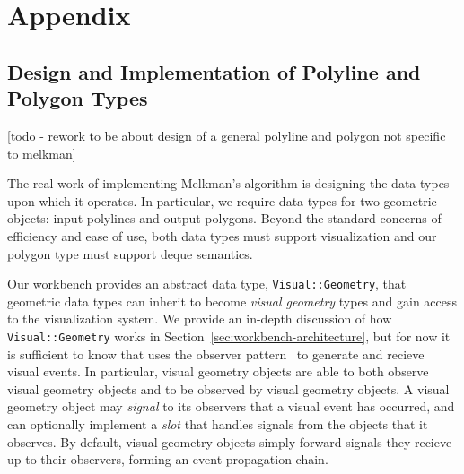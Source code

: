 
\section{Appendix}

% 
% 
% 
% 
% 
% 
% 
% 

\subsection{Design and Implementation of Polyline and Polygon Types}
\label{sec:polyline-polygon}

[todo - rework to be about design of a general polyline and polygon not
specific to melkman]

The real work of implementing Melkman's algorithm is designing the data types
upon which it operates. In particular, we require data types for two geometric
objects: input polylines and output polygons. Beyond the standard concerns of
efficiency and ease of use, both data types must support visualization and our
polygon type must support deque semantics.

Our workbench provides an abstract data type, \texttt{Visual::Geometry}, that
geometric data types can inherit to become \emph{visual geometry} types and gain
access to the visualization system. We provide an in-depth discussion of how
\texttt{Visual::Geometry} works in Section~\ref{sec:workbench-architecture}, but
for now it is sufficient to know that uses the observer
pattern~\cite{gamma1994design} to generate and recieve visual events. In
particular, visual geometry objects are able to both observe visual geometry
objects and to be observed by visual geometry objects. A visual geometry object
may \emph{signal} to its observers that a visual event has occurred, and can
optionally implement a \emph{slot} that handles signals from the objects that it
observes. By default, visual geometry objects simply forward signals they
recieve up to their observers, forming an event propagation chain.


